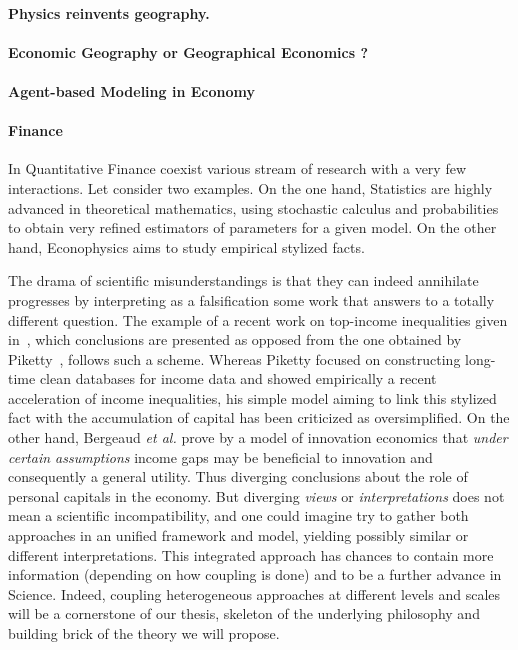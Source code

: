 \paragraph{Physics reinvents geography.} 



\paragraph{Economic Geography or Geographical Economics ?}



\paragraph{Agent-based Modeling in Economy}


\paragraph{Finance}

In Quantitative Finance coexist various stream of research with a very few interactions. Let consider two examples. On the one hand, Statistics are highly advanced in theoretical mathematics, using stochastic calculus and probabilities to obtain very refined estimators of parameters for a given model.%
 On the other hand, Econophysics aims to study empirical stylized facts.



The drama of scientific misunderstandings is that they can indeed annihilate progresses by interpreting as a falsification some work that answers to a totally different question. The example of a recent work on top-income inequalities given in~\cite{aghion2015innovation}, which conclusions are presented as opposed from the one obtained by Piketty~\cite{piketty2013capital}, follows such a scheme. Whereas Piketty focused on constructing long-time clean databases for income data and showed empirically a recent acceleration of income inequalities, his simple model aiming to link this stylized fact with the accumulation of capital has been criticized as oversimplified. On the other hand, Bergeaud \textit{et al.} prove by a model of innovation economics that \emph{under certain assumptions} income gaps may be beneficial to innovation and consequently a general utility. Thus diverging conclusions about the role of personal capitals in the economy. But diverging \emph{views} or \emph{interpretations} does not mean a scientific incompatibility, and one could imagine try to gather both approaches in an unified framework and model, yielding possibly similar or different interpretations. This integrated approach has chances to contain more information (depending on how coupling is done) and to be a further advance in Science. Indeed, coupling heterogeneous approaches at different levels and scales will be a cornerstone of our thesis, skeleton of the underlying philosophy and building brick of the theory we will propose.



